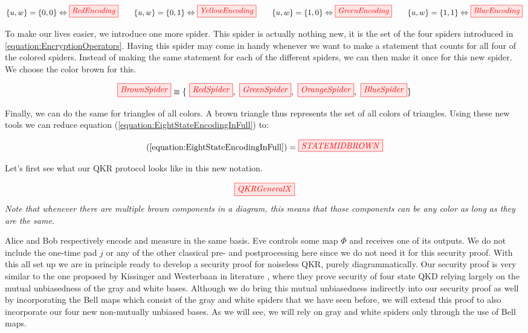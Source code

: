 \documentclass[]{article}
\begin{document}
\begin{equation}
	\label{equation:EncryptionOperators}
	\{u,w\} = \{0, 0\} \Leftrightarrow \tikzfig{RedEncoding} ~~~~~~ \{u,w\} = \{0, 1\} \Leftrightarrow \tikzfig{YellowEncoding}~~~~~~ \{u,w\} = \{1, 0\} \Leftrightarrow \tikzfig{GreenEncoding}~~~~~~ \{u,w\} = \{1, 1\} \Leftrightarrow \tikzfig{BlueEncoding}
\end{equation}

To make our lives easier, we introduce one more spider. This spider is actually nothing new, it is the set of the four spiders introduced in \ref{equation:EncryptionOperators}. Having this spider may come in handy whenever we want to make a statement that counts for all four of the colored spiders. Instead of making the same statement for each of the different spiders, we can then make it once for this new spider. We choose the color brown for this.

\begin{equation}
\label{equation:brownspiderset}
\tikzfig{BrownSpider} \equiv \{~\tikzfig{RedSpider},~ \tikzfig{GreenSpider},~ \tikzfig{OrangeSpider},~ \tikzfig{BlueSpider}\}
\end{equation}

Finally, we can do the same for triangles of all colors. A brown triangle thus represents the set of all colors of triangles. Using these new tools we can reduce equation (\ref{equation:EightStateEncodingInFull}) to:

\begin{equation}
\label{equation:EightStateEncodingInFullBrown}
(\ref{equation:EightStateEncodingInFull}) = \tikzfig{STATEMIDBROWN}
\end{equation}

Let's first see what our QKR protocol looks like in this new notation.

\begin{equation}
	\label{equation:QKRGeneralFirstIntroduced}
	\tikzfig{QKRGeneralX}
\end{equation}
\textit{Note that whenever there are multiple brown components in a diagram, this means that those components can be any color as long as they are the same.}

Alice and Bob respectively encode and measure in the same basis. Eve controls some map $\Phi$ and receives one of its outputs. We do not include the one-time pad $j$ or any of the other classical pre- and postprocessing here since we do not need it for this security proof. With this all set up we are in principle ready to develop a security proof for noiseless QKR, purely diagrammatically. Our security proof is very similar to the one proposed by Kissinger and Westerbaan in literature \cite{Kissinger2017}, where they prove security of four state QKD relying largely on the mutual unbiasedness of the gray and white bases. Although we do bring this mutual unbiasedness indirectly into our security proof as well by incorporating the Bell maps which consist of the gray and white spiders that we have seen before, we will extend this proof to also incorporate our four new non-mutually unbiased bases. As we will see, we will rely on gray and white spiders only through the use of Bell maps.
\end{document}
